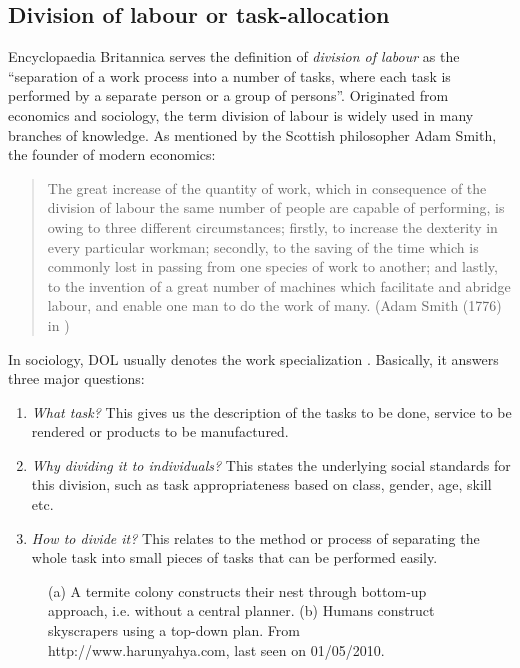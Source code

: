 \subsection{Division of labour or task-allocation}
\label{bg:def:dol}
Encyclopaedia Britannica serves the definition of {\em division of labour} as the ``separation of a work process into a number of tasks, where each task is performed by a separate person or a group of persons''. Originated from economics and sociology, the term division of labour is widely used in many branches of knowledge. As mentioned by the Scottish philosopher Adam Smith, the founder of modern economics:
\begin{quote}
\ssp 
The great increase of the quantity of work, which in consequence of the division of labour the same number of people are capable of performing, is owing to three different circumstances; firstly, to increase the dexterity in every particular workman; secondly, to the saving of the time which is commonly lost in passing from one species of work to another; and lastly, to the invention of a great number of machines which facilitate and abridge labour, and enable one man to do the work of many.
(Adam Smith (1776) in )
\end{quote} 
\sdp
In sociology, DOL usually denotes the work specialization \cite{Sayer+1992}. Basically, it answers three major questions:
\begin{enumerate}
\item {\em What task?} This gives us the description of the tasks to be done, service to be rendered or products to be manufactured.
\item {\em Why dividing it to individuals?} This states the underlying social standards for this division, such as task appropriateness based on class, gender, age, skill etc.
\item {\em How to divide it?} This relates to the method or process of separating the whole task into small pieces of tasks that can be performed easily. 
\end{enumerate}
\begin{figure}[htp]
\centering
{} 
\hspace{0.25cm}
\caption{(a) A termite colony constructs their nest through bottom-up approach, i.e. without a central planner. (b) Humans construct skyscrapers using a top-down plan. From http://www.harunyahya.com, last seen on 01/05/2010.}
\label{fig:termite-nest}
\end{figure}
